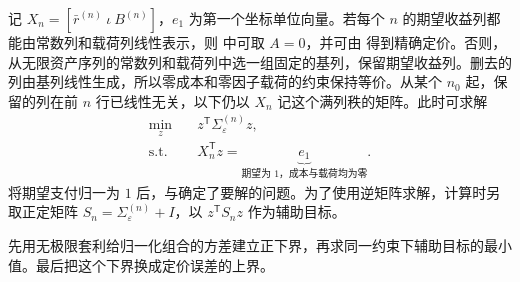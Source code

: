 记 $X_n=[\bar r^{(n)}\ \iota\ B^{(n)}]$，$e_1$ 为第一个坐标单位向量。若每个 $n$ 的期望收益列都能由常数列和载荷列线性表示，则 中可取 $A=0$，并可由 得到精确定价。否则，从无限资产序列的常数列和载荷列中选一组固定的基列，保留期望收益列。删去的列由基列线性生成，所以零成本和零因子载荷的约束保持等价。从某个 $n_0$ 起，保留的列在前 $n$ 行已线性无关，以下仍以 $X_n$ 记这个满列秩的矩阵。此时可求解
\begin{align}
 \min_z\quad &z^{\mathsf T}\Sigma_\varepsilon^{(n)}z,
 \tag{A.1a}\label{eq:wj-14-appendix-objective}\\
 \text{s.t.}\quad &X_n^{\mathsf T}z=
 \underbrace{e_1}_{\text{期望为 1，成本与载荷均为零}}.
 \tag{A.1b}\label{eq:wj-14-appendix-constraint}
\end{align}
将期望支付归一为 $1$ 后，与确定了要解的问题。为了使用逆矩阵求解，计算时另取正定矩阵 $S_n=\Sigma_\varepsilon^{(n)}+I$，以 $z^{\mathsf T}S_nz$ 作为辅助目标。

先用无极限套利给归一化组合的方差建立正下界，再求同一约束下辅助目标的最小值。最后把这个下界换成定价误差的上界。

